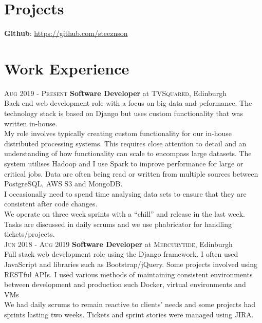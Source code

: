 \documentclass[14pt, a4paper]{extarticle}
\begin{document}
\begin{multicols}{2}
\section{Projects}
\noindent\textbf{Github}: \url{https://github.com/steeznson}

\columnbreak
\section{Work Experience}
\noindent\textsc{Aug 2019 - Present} \textbf{Software Developer}
at \textsc{TVSquared}, Edinburgh\\
Back end web development role with a focus on big data and peformance. The technology stack is based on Django but uses custom functionality that was written in-house.\\ 
My role involves typically creating custom functionality for our in-house distributed processing systems. This requires close attention to detail and an understanding of how functionality can scale to encompass large datasets. The system utilises Hadoop and I use Spark to improve performance for large or critical jobs. Data are often being read or written from multiple sources between PostgreSQL, AWS S3 and MongoDB.\\
I occasionally need to spend time analysing data sets to ensure that they are consistent after code changes.\\
We operate on three week sprints with a ``chill'' and release in the last week.  Tasks are discussed in daily scrums and we use phabricator for handling tickets/projects.\\
\noindent\textsc{Jun 2018 - Aug 2019} \textbf{Software Developer}
at \textsc{Mercurytide}, Edinburgh\\
Full stack web development role using the Django framework. I often used JavaScript and libraries such as Bootstrap/jQuery. Some projects involved using RESTful APIs. I used various methods of maintaining consistent environments between development and production such Docker, virtual environments and VMs\\
We had daily scrums to remain reactive to clients' needs and some projects had sprints lasting two weeks. Tickets and sprint stories were managed using JIRA.\\
\end{multicols}
\end{document}
